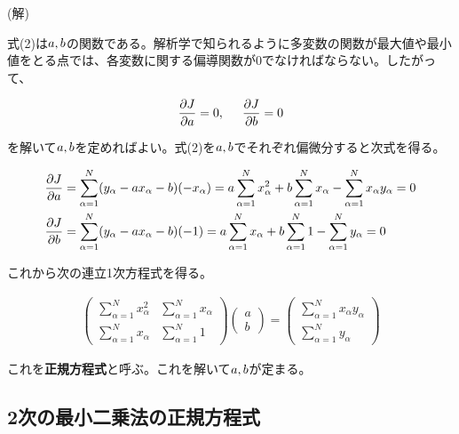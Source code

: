 \documentclass[a4]{jarticle}
\begin{document}
(解)

式(2)は${\sl a,b}$の関数である。解析学で知られるように多変数の関数が最大値や最小値をとる点では、各変数に関する偏導関数が0でなければならない。したがって、

\begin{equation}
\frac{\partial J}{\partial a} = 0,\hspace{5truemm} \frac{\partial J}{\partial b} = 0
\end{equation}

を解いて${\sl a,b}$を定めればよい。式(2)を${\sl a,b}$でそれぞれ偏微分すると次式を得る。

\begin{eqnarray}
\frac{\partial J}{\partial a} = \sum_{\alpha = 1}^{N}(y_\alpha - ax_\alpha - b)(-x_\alpha) = a\sum_{\alpha = 1}^{N}x^2_\alpha + b\sum_{\alpha = 1}^{N}x_\alpha - \sum_{\alpha = 1}^{N}x_\alpha y_\alpha = 0 \nonumber \\
\frac{\partial J}{\partial b} = \sum_{\alpha = 1}^{N}(y_\alpha - ax_\alpha - b)(-1) = a\sum_{\alpha = 1}^{N}x_\alpha + b\sum_{\alpha = 1}^{N}1 - \sum_{\alpha = 1}^{N}y_\alpha = 0 \hspace{8.5truemm} 
\end{eqnarray}

これから次の連立1次方程式を得る。

\begin{eqnarray}
\left(
\begin{array}{cc}
\sum_{\alpha = 1}^{N}x^2_\alpha & \sum_{\alpha = 1}^{N}x_\alpha \\
\sum_{\alpha = 1}^{N}x_\alpha & \sum_{\alpha = 1}^{N}1
\end{array}
\right)
\left(
\begin{array}{cc}
a \\
b
\end{array}
\right)
=
\left(
\begin{array}{cc}
\sum_{\alpha = 1}^{N}x_\alpha y_\alpha \\
\sum_{\alpha = 1}^{N}y_\alpha
\end{array}
\right)
\end{eqnarray}

これを{\bf 正規方程式}と呼ぶ。これを解いて${\sl a,b}$が定まる。

\subsection{2次の最小二乗法の正規方程式}

\begin{center}
\end{center}
\end{document}

